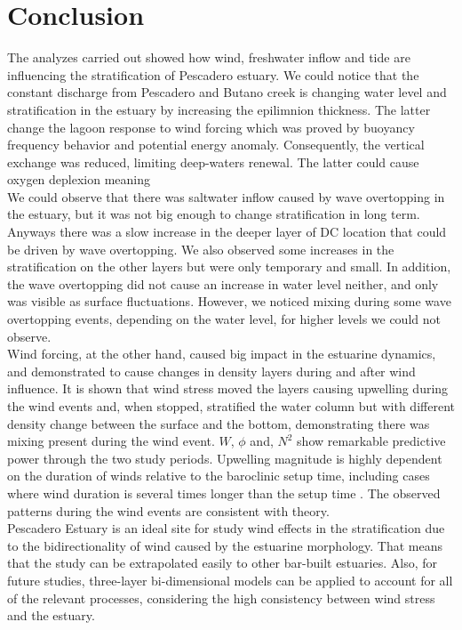 \documentclass[tesis.tex]{subfiles}
\begin{document}
  
\section{Conclusion}

The analyzes carried out showed how wind, freshwater inflow and tide are influencing the stratification of Pescadero estuary. We could notice that the constant discharge from Pescadero and Butano creek is changing water level and stratification in the estuary by increasing the epilimnion thickness. The latter change the lagoon response to wind forcing which was proved by buoyancy frequency behavior and potential energy anomaly. Consequently, the vertical exchange was reduced, limiting deep-waters renewal. The latter could cause oxygen deplexion meaning \\

We could observe that there was saltwater inflow caused by wave overtopping in the estuary, but it was not big enough to change stratification in long term. Anyways there was a slow increase in the deeper layer of DC location that could be driven by wave overtopping. We also observed some increases in the stratification on the other layers but were only temporary and small. In addition, the wave overtopping did not cause an increase in water level neither, and only was visible as surface fluctuations. However, we noticed mixing during some wave overtopping events, depending on the water level, for higher levels we could not observe.\\

Wind forcing, at the other hand, caused big impact in the estuarine dynamics, and demonstrated to cause changes in density layers during and after wind influence. It is shown that wind stress moved the layers causing upwelling during the wind events and, when stopped, stratified the water column but with different density change between the surface and the bottom, demonstrating there was mixing present during the wind event. $W$, $\phi$ and, $N^2$ show remarkable predictive power through the two study periods. Upwelling magnitude is highly dependent on the duration of winds relative to the baroclinic setup time, including cases where wind duration is several times longer than the setup time \citep{delafuente2010strong}. The observed patterns during the wind events are consistent with theory.\\

Pescadero Estuary is an ideal site for study wind effects in the stratification due to the bidirectionality of wind caused by the estuarine morphology. That means that the study can be extrapolated easily to other bar-built estuaries. Also, for future studies, three-layer bi-dimensional models can be applied to account for all of the relevant processes, considering the high consistency between wind stress and the estuary.\\
\end{document}
